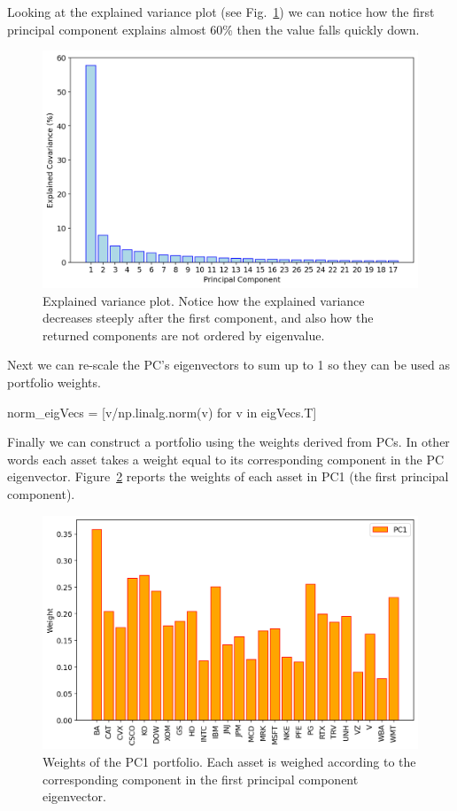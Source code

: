 Looking at the explained variance plot (see Fig.~\ref{fig:explained_variance}) we can notice how the first principal component explains almost 60\% then the value falls quickly down.

\begin{figure}[htb]
	\centering
	\includegraphics[width=.7\textwidth]{figures/portfolio_pca_expl_var}
	\caption{Explained variance plot. Notice how the explained variance decreases steeply after the first component, and also how the returned components are not ordered by eigenvalue.}
	\label{fig:explained_variance}
\end{figure}
		
Next we can re-scale the PC's eigenvectors to sum up to 1 so they can be used as portfolio weights.
	
\begin{ipython}
norm_eigVecs = [v/np.linalg.norm(v) for v in eigVecs.T]
\end{ipython}
	
Finally we can construct a portfolio using the weights derived from PCs. In other words each asset takes a weight equal to its corresponding component in the PC eigenvector. Figure~\ref{fig:pca_weights} reports the weights of each asset in PC1 (the first principal component).
	
\begin{figure}[htb]
	\centering
	\includegraphics[width=.7\textwidth]{figures/portfolio_pca_pc1_weights}
	\caption{Weights of the PC1 portfolio. Each asset is weighed according to the corresponding component in the first principal component eigenvector.}
	\label{fig:pca_weights}
\end{figure}
	

